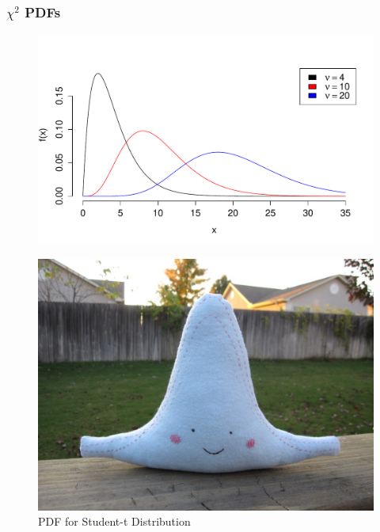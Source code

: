 \documentclass[handout]{beamer}
\begin{document}

\begin{frame}
\frametitle{$\chi^2$ PDFs}

\begin{figure}
\includegraphics[scale = 0.58]{./images/chisq}
\end{figure}
\end{frame}


\begin{frame}
\begin{figure}
\includegraphics[scale = 0.2]{./images/t_etsy1}
\caption{PDF for Student-t Distribution}
\end{figure}
\end{frame}
\end{document}
